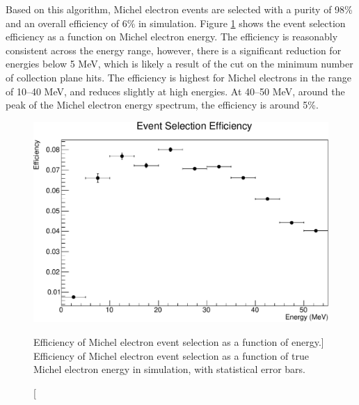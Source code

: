 \bigskip\noindent
Based on this algorithm, Michel electron events are selected with a
purity of 98\% and an overall efficiency of 6\% in \protodune{} simulation.
Figure \ref{fig:ev_sel_eff} shows the event selection efficiency as a
function on Michel electron energy. The efficiency is reasonably consistent
across the energy range, however, there is a significant reduction for energies
below 5 MeV, which is likely a result of the cut on the minimum number of
collection plane hits. The efficiency is highest for Michel electrons in the
range of 10--40 MeV, and reduces slightly at high energies. At 40--50 MeV,
around the peak of the Michel electron energy spectrum, the efficiency is 
around 5\%.  
\begin{figure}
	\centering
	\includegraphics[width=\textwidth, height=0.68\textwidth]{figures/eff_v_energy.pdf}
	\caption
	[Efficiency of Michel electron event selection as a function of energy.]
	{Efficiency of Michel electron event selection as a function of true Michel
	electron energy in \protodune{} simulation, with statistical error bars.}
	\label{fig:ev_sel_eff}
\end{figure}

